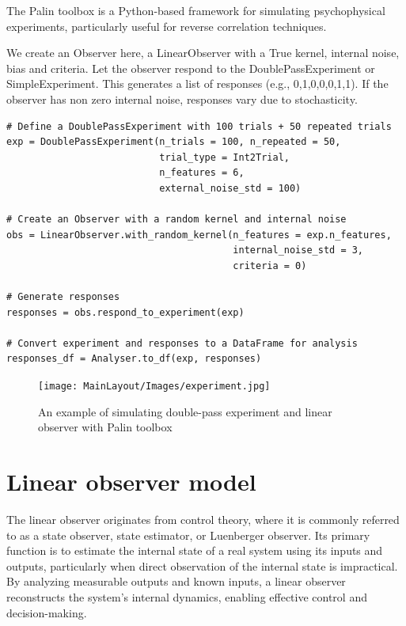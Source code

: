 \begin{tcolorbox}[title=Palin Toolbox: Simulate experiment and linear observer,
    colback=white!30!white, colframe=blue!80!white]
The Palin toolbox is a Python-based framework for simulating psychophysical experiments, particularly useful for reverse correlation techniques. 

We create an Observer here, a LinearObserver with a True kernel, internal noise, bias and criteria. Let the observer respond to the DoublePassExperiment or SimpleExperiment.
This generates a list of responses (e.g., 0,1,0,0,0,1,1). 
If the observer has non zero internal noise, responses vary due to stochasticity.

\tcblower

\begin{verbatim}
# Define a DoublePassExperiment with 100 trials + 50 repeated trials
exp = DoublePassExperiment(n_trials = 100, n_repeated = 50, 
                           trial_type = Int2Trial, 
                           n_features = 6, 
                           external_noise_std = 100)

# Create an Observer with a random kernel and internal noise
obs = LinearObserver.with_random_kernel(n_features = exp.n_features,
                                        internal_noise_std = 3, 
                                        criteria = 0)

# Generate responses
responses = obs.respond_to_experiment(exp)

# Convert experiment and responses to a DataFrame for analysis
responses_df = Analyser.to_df(exp, responses)

\end{verbatim}

\end{tcolorbox}


\begin{figure}[ht!]
    \centering
    \texttt{[image: MainLayout/Images/experiment.jpg]}
    \caption{\small An example of simulating double-pass experiment and linear observer with Palin toolbox}
    \label{fig:experiment}
\end{figure}


\section {Linear observer model} 
The linear observer originates from control theory, where it is commonly referred to as a state observer, state estimator, or Luenberger observer. Its primary function is to estimate the internal state of a real system using its inputs and outputs, particularly when direct observation of the internal state is impractical. By analyzing measurable outputs and known inputs, a linear observer reconstructs the system’s internal dynamics, enabling effective control and decision-making.

